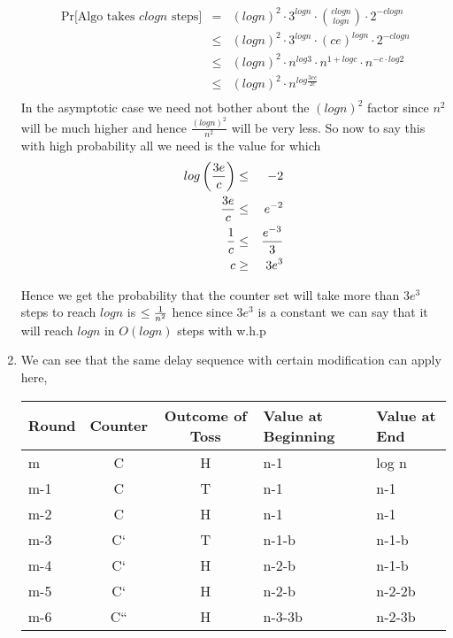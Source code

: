 \documentclass{assignment}
\begin{document}
\begin{problemlist}
\begin{problem}
\begin{answer}
\begin{enumerate}
\begin{eqnarray}
\text{ Pr[Algo takes $c log n$ steps]}& = & (log n)^2 \cdot 3^{log n} \cdot \binom {c log n}{log n} \cdot 2^{-c log n } \\
& \leq & (log n)^2 \cdot 3^{log n} \cdot (ce)^{log n} \cdot 2^{-c log n } \\
& \leq & (log n)^2 \cdot n^{log 3} \cdot n^{1+log c} \cdot n^{-c\cdot log 2} \\
& \leq & (log n)^2 \cdot n^{log \frac{3ec}{2c}}\\ 
\end{eqnarray}
In the asymptotic case we need not bother about the $(log n)^2$ factor since $n^{2}$ will be much higher and hence $\frac{(log n)^2}{n^2}$ will be very less. 
So now to say this with high probability all we need is the value for which
\begin{eqnarray}
log \left( { 3e \over c} \right) & \leq & -2 \\
{3e \over c} & \leq & e^{-2} \\
{1 \over c} & \leq & {e^{-3} \over 3} \\
c & \geq & {3e^3} 
\end{eqnarray}
 
Hence we get the probability that the counter set will take more than $3e^3$ steps to reach $log n$ is $\leq {1 \over n^2}$ hence since $3e^3$ is a constant we can say that it will reach $log n$ in $O(log n)$ steps with w.h.p

\item We can see that the same delay sequence with certain modification can apply here, 

\begin{center}
\begin{tabular}{l|c|c|l|l}
Round & Counter & Outcome of Toss & Value at Beginning & Value at End\\
\hline
m & C & H & n-1 & log n\\
m-1 & C & T & n-1 &  n-1\\
m-2 & C & H & n-1 &  n-1 \\
m-3 & C`& T & n-1-b & n-1-b \\
m-4 & C`& H & n-2-b & n-1-b \\
m-5 & C`& H &  n-2-b & n-2-2b \\
m-6 & C``& H & n-3-3b & n-2-3b 
\end{tabular}
\end{center}


\end{enumerate}
\end{answer}
\end{problem}
\end{problemlist}
\end{document}
